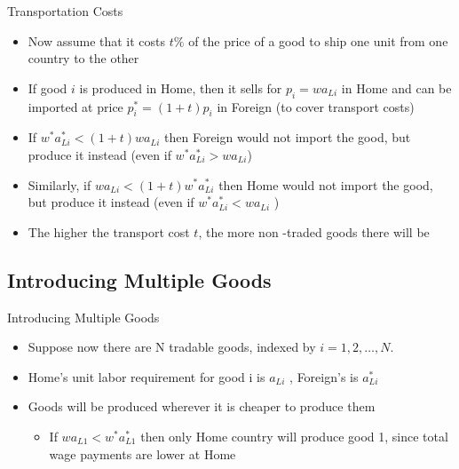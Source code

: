 \documentclass[10pt,hyperref={CJKbookmarks=true},xcolor=dvipsnames,aspectratio=169]{beamer}
\begin{document}
\begin{frame}{Transportation Costs }

\begin{itemize}
\item Now assume that it costs $t\%$ of the price of a good to ship one
unit from one country to the other 
\item If good $i$ is produced in Home, then it sells for $p_{i}=wa_{Li}$
in Home and can be imported at price $p_{i}^{*}=(1+t)p_{i}$ in Foreign
(to cover transport costs) 
\item If $w^{*}a_{Li}^{*}<(1+t)wa_{Li}$ then Foreign would not import the
good, but produce it instead (even if $w^{*}a_{Li}^{*}>wa_{Li}$) 
\item Similarly, if $wa$$_{Li}<(1+t)w^{*}a_{Li}^{*}$ then Home would not
import the good, but produce it instead (even if $w^{*}a_{Li}^{*}<wa_{Li}$
) 
\item The higher the transport cost $t$, the more non -traded goods there
will be 
\end{itemize}
\end{frame}



\subsection{Introducing Multiple Goods }
\begin{frame}{Introducing Multiple Goods }

\begin{itemize}
\item Suppose now there are N tradable goods, indexed by $i=1,2,\ldots,N$. 
\item Home’s unit labor requirement for good i is $a{}_{Li}$ , Foreign’s
is $a_{Li}^{*}$ 
\item Goods will be produced wherever it is cheaper to produce them 

\begin{itemize}
\item If $wa_{L1}<w^{*}a_{L1}^{*}$ then only Home country will produce
good 1, since total wage payments are lower at Home 
\end{itemize}
\end{itemize}
\end{frame}
\end{document}
